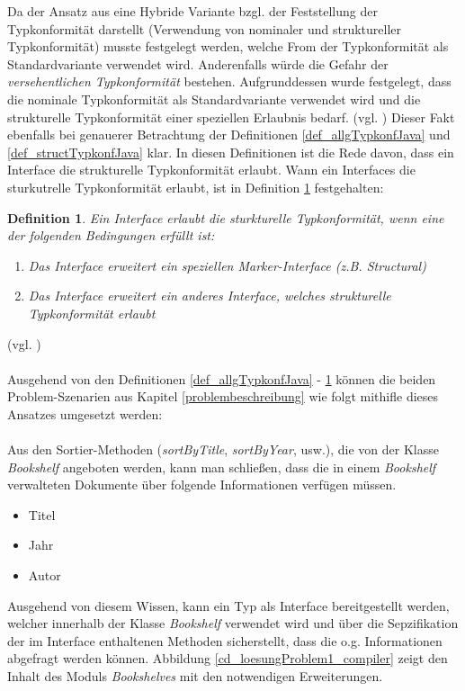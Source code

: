 \documentclass[11pt, 
ngerman,
doublespacing,
chapterinoneline, %
consistentlayout, %
]{scrartcl}
\newtheorem{definition}{Definition}
\begin{document}
Da der Ansatz aus \cite{structconfjava} eine Hybride Variante bzgl. der Feststellung der Typkonformität darstellt (Verwendung von nominaler und struktureller Typkonformität) musste festgelegt werden, welche From der Typkonformität als Standardvariante verwendet wird. Anderenfalls würde die Gefahr der \emph{versehentlichen Typkonformität} bestehen. Aufgrunddessen wurde festgelegt, dass die nominale Typkonformität als Standardvariante verwendet wird und die strukturelle Typkonformität einer speziellen Erlaubnis bedarf. (vgl. \cite{structconfjava}) Dieser Fakt ebenfalls bei genauerer Betrachtung der Definitionen \ref{def_allgTypkonfJava} und \ref{def_structTypkonfJava} klar. In diesen Definitionen ist die Rede davon, dass ein Interface die strukturelle Typkonformität erlaubt. Wann ein Interfaces die sturkutrelle Typkonformität erlaubt, ist in Definition \ref{def_allowStruct} festgehalten: \begin{definition}\label{def_allowStruct}
Ein Interface erlaubt die sturkturelle Typkonformität, wenn eine der folgenden Bedingungen erfüllt ist:
\begin{enumerate}
\item Das Interface erweitert ein speziellen Marker-Interface (z.B. \emph{Structural})
\item Das Interface erweitert ein anderes Interface, welches strukturelle Typkonformität erlaubt
\end{enumerate} 
\end{definition} (vgl. \cite{structconfjava})\\\\
Ausgehend von den Definitionen \ref{def_allgTypkonfJava} - \ref{def_allowStruct} können die beiden Problem-Szenarien aus Kapitel \ref{problembeschreibung} wie folgt mithifle dieses Ansatzes umgesetzt werden:\\\\
Aus den Sortier-Methoden (\emph{sortByTitle}, \emph{sortByYear}, usw.), die von der Klasse \emph{Bookshelf} angeboten werden, kann man schließen, dass die in einem \emph{Bookshelf} verwalteten Dokumente über folgende Informationen verfügen müssen.
\begin{itemize}
\item Titel
\item Jahr
\item Autor
\end{itemize}
Ausgehend von diesem Wissen, kann ein Typ als Interface bereitgestellt werden, welcher innerhalb der Klasse \emph{Bookshelf} verwendet wird und über die Sepzifikation der im Interface enthaltenen Methoden sicherstellt, dass die o.g. Informationen abgefragt werden können. Abbildung \ref{cd_loesungProblem1_compiler} zeigt den Inhalt des Moduls \emph{Bookshelves} mit den notwendigen Erweiterungen. 
\end{document}
